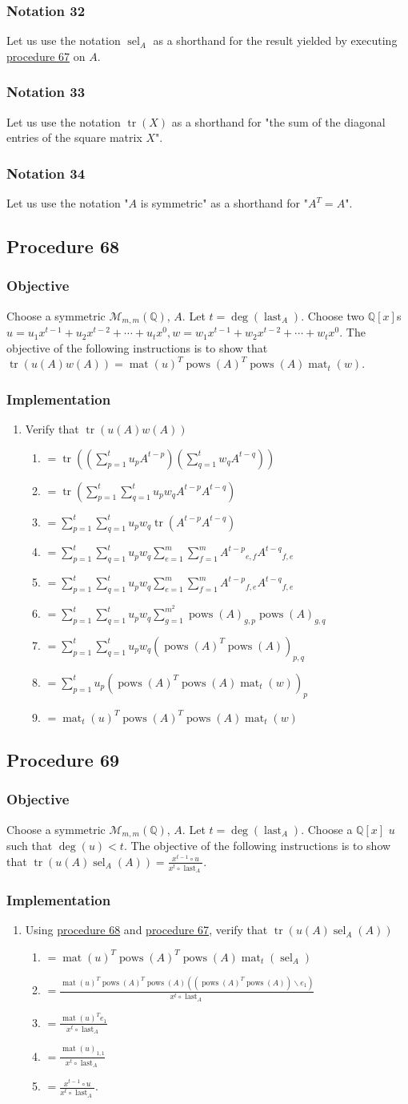 \documentclass[twocolumn]{article}
\DeclareMathOperator{\mat}{mat}
\DeclareMathOperator{\tr}{tr}
\DeclareMathOperator{\pows}{pows}
\DeclareMathOperator{\sel}{sel}
\DeclareMathOperator{\last}{last}
\newcommand{\notation}[1]{\subsubsection*{Notation #1}}
\newcommand{\procedure}[2][]{\subsection*{Procedure #2 \ifthenelse{\equal{#1}{}}{}{(#1)}}\label{sec:procedure #2}}
\newcommand{\objective}{\subsubsection*{Objective}}
\newcommand{\implementation}{\subsubsection*{Implementation}}
\begin{document}
		\notation{32}
			Let us use the notation $\sel_A$ as a shorthand for the result yielded by executing \hyperref[sec:procedure 67]{procedure 67} on $A$.
		\notation{33}
			Let us use the notation $\tr(X)$ as a shorthand for "the sum of the diagonal entries of the square matrix $X$".
		\notation{34}
			Let us use the notation "$A$ is symmetric" as a shorthand for "$A^T=A$".
		\procedure{68}
			\objective
				Choose a symmetric $\mathcal{M}_{m,m}(\mathbb{Q})$, $A$. Let $t=\deg(\last_A)$. Choose two $\mathbb{Q}[x]$s $u=u_1x^{t-1}+u_2x^{t-2}+\cdots+u_tx^0,w=w_1x^{t-1}+w_2x^{t-2}+\cdots+w_tx^0$. The objective of the following instructions is to show that $\tr(u(A)w(A))=\mat(u)^T\pows(A)^T\pows(A)\mat_t(w)$.
			\implementation
				\begin{enumerate}
					\item Verify that $\tr(u(A)w(A))$
					\begin{enumerate}
						\item $=\tr((\sum_{p=1}^t u_pA^{t-p})(\sum_{q=1}^t w_qA^{t-q}))$
						\item $=\tr(\sum_{p=1}^t\sum_{q=1}^t u_pw_qA^{t-p}A^{t-q})$
						\item $=\sum_{p=1}^t\sum_{q=1}^t u_pw_q\tr(A^{t-p}A^{t-q})$
						\item $=\sum_{p=1}^t\sum_{q=1}^t u_pw_q\sum_{e=1}^m\sum_{f=1}^m{A^{t-p}}_{e,f}{A^{t-q}}_{f,e}$
						\item $=\sum_{p=1}^t\sum_{q=1}^t u_pw_q\sum_{e=1}^m\sum_{f=1}^m{A^{t-p}}_{f,e}{A^{t-q}}_{f,e}$
						\item $=\sum_{p=1}^t\sum_{q=1}^t u_pw_q\sum_{g=1}^{m^2}{\pows(A)}_{g,p}{\pows(A)}_{g,q}$
						\item $=\sum_{p=1}^t\sum_{q=1}^t u_pw_q(\pows(A)^T\pows(A))_{p,q}$
						\item $=\sum_{p=1}^t u_p(\pows(A)^T\pows(A)\mat_t(w))_{p}$
						\item $=\mat_t(u)^T\pows(A)^T\pows(A)\mat_t(w)$
					\end{enumerate}
				\end{enumerate}
		\procedure{69}
			\objective
				Choose a symmetric $\mathcal{M}_{m,m}(\mathbb{Q})$, $A$. Let $t=\deg(\last_A)$. Choose a $\mathbb{Q}[x]$ $u$ such that $\deg(u)<t$. The objective of the following instructions is to show that $\tr(u(A)\sel_A(A))=\frac{x^{t-1}\circ u}{x^t\circ\last_A}$.
			\implementation
				\begin{enumerate}
					\item Using \hyperref[sec:procedure 68]{procedure 68} and \hyperref[sec:procedure 67]{procedure 67}, verify that $\tr(u(A)\sel_A(A))$
					\begin{enumerate}
						\item $=\mat(u)^T\pows(A)^T\pows(A)\mat_t(\sel_A)$
						\item $=\frac{\mat(u)^T\pows(A)^T\pows(A)((\pows(A)^T\pows(A))\backslash e_1)}{x^t\circ\last_A}$
						\item $=\frac{\mat(u)^Te_1}{x^t\circ\last_A}$
						\item $=\frac{\mat(u)_{1,1}}{x^t\circ\last_A}$
						\item $=\frac{x^{t-1}\circ u}{x^t\circ\last_A}$.
					\end{enumerate}
				\end{enumerate}
\end{document}
